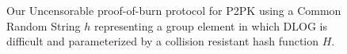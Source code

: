 \begin{figure}[t]
\begin{algorithm}[H]
    \caption{\label{alg.construction-crs} Our Uncensorable proof-of-burn protocol for P2PK using a Common Random String $h$ representing
    a group element in which DLOG is difficult and parameterized by
    a collision resistant hash function $H$.}
    \begin{algorithmic}[1]
            \State{}
        \EndFunction
            \State{}
        \EndFunction
        \vskip8pt
    \end{algorithmic}
\end{algorithm}
\end{figure}
